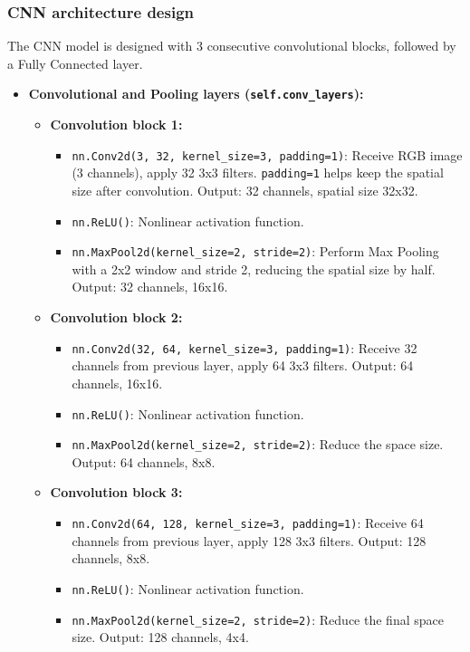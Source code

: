 \documentclass[12pt]{article}
\begin{document}
\subsubsection{CNN architecture design}
The CNN model is designed with 3 consecutive convolutional blocks, followed by a Fully Connected layer.
\begin{itemize}
    \item \textbf{Convolutional and Pooling layers (\texttt{self.conv\_layers}):}
    \begin{itemize}
        \item \textbf{Convolution block 1:}
        \begin{itemize}
            \item \texttt{nn.Conv2d(3, 32, kernel\_size=3, padding=1)}: Receive RGB image (3 channels), apply 32 3x3 filters. \texttt{padding=1} helps keep the spatial size after convolution. Output: 32 channels, spatial size 32x32.
            \item \texttt{nn.ReLU()}: Nonlinear activation function.
            \item \texttt{nn.MaxPool2d(kernel\_size=2, stride=2)}: Perform Max Pooling with a 2x2 window and stride 2, reducing the spatial size by half. Output: 32 channels, 16x16.
        \end{itemize}
        \item \textbf{Convolution block 2:}
        \begin{itemize}
            \item \texttt{nn.Conv2d(32, 64, kernel\_size=3, padding=1)}: Receive 32 channels from previous layer, apply 64 3x3 filters. Output: 64 channels, 16x16.
            \item \texttt{nn.ReLU()}: Nonlinear activation function.
            \item \texttt{nn.MaxPool2d(kernel\_size=2, stride=2)}: Reduce the space size. Output: 64 channels, 8x8.
        \end{itemize}
        \item \textbf{Convolution block 3:}
        \begin{itemize}
            \item \texttt{nn.Conv2d(64, 128, kernel\_size=3, padding=1)}: Receive 64 channels from previous layer, apply 128 3x3 filters. Output: 128 channels, 8x8.
            \item \texttt{nn.ReLU()}: Nonlinear activation function.
            \item \texttt{nn.MaxPool2d(kernel\_size=2, stride=2)}: Reduce the final space size. Output: 128 channels, 4x4.

\end{itemize}
\end{itemize}
\end{itemize}
\end{document}

